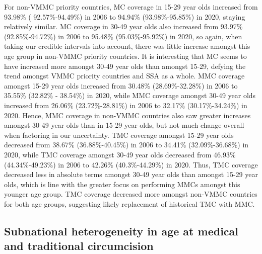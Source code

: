 \documentclass{article}
\begin{document}
For non-VMMC priority countries, MC coverage in 15-29 year olds increased from 93.98\% (
92.57\%-94.49\%) in 2006 to 94.94\% (93.98\%-95.85\%) in 2020, staying relatively similar. MC coverage in
30-49 year olds also increased from 93.97\% (92.85\%-94.72\%) in 2006 to 95.48\% (95.03\%-95.92\%) in 2020,
so again, when taking our credible intervals into account, there was little increase amongst this age group in
non-VMMC priority countries. It is interesting that MC seems to have increased more amongst 30-49 year
olds than amongst 15-29, defying the trend amongst VMMC priority countries and SSA as a whole. MMC
coverage amongst 15-29 year olds increased from 30.48\% (28.69\%-32.28\%) in 2006 to 35.55\% (32.82\% -
38.54\%) in 2020, while MMC coverage amongst 30-49 year olds increased from 26.06\% (23.72\%-28.81\%) in
2006 to 32.17\% (30.17\%-34.24\%) in 2020. Hence, MMC coverage in non-VMMC countries also saw greater
increases amongst 30-49 year olds than in 15-29 year olds, but not much change overall when factoring in our
uncertainty. TMC coverage amongst 15-29 year olds decreased from 38.67\% (36.88\%-40.45\%) in 2006 to
34.41\% (32.09\%-36.68\%) in 2020, while TMC coverage amongst 30-49 year olds decreased from 46.93\%
(44.34\%-49.23\%) in 2006 to 42.26\% (40.3\%-44.29\%) in 2020. Thus, TMC coverage decreased less in
absolute terms amongst 30-49 year olds than amongst 15-29 year olds, which is line with the greater focus on
performing MMCs amongst this younger age group. TMC coverage decreased more amongst non-VMMC
countries for both age groups, suggesting likely replacement of historical TMC with MMC.

\subsection{Subnational heterogeneity in age at medical and traditional circumcision}
\end{document}
